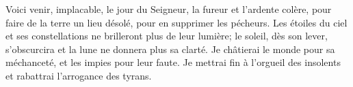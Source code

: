 Voici venir, implacable, le jour du Seigneur,
	la fureur et l’ardente colère,
	pour faire de la terre un lieu désolé,
	pour en supprimer les pécheurs.
Les étoiles du ciel et ses constellations ne brilleront plus de leur lumière;
	le soleil, dès son lever, s’obscurcira
	et la lune ne donnera plus sa clarté.
Je châtierai le monde pour sa méchanceté,
	et les impies pour leur faute.
	Je mettrai fin à l’orgueil des insolents
	et rabattrai l’arrogance des tyrans.
